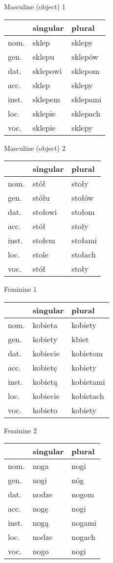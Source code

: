 \documentclass[10pt,twoside]{../filofax2}
\begin{document}
\begin{ffpage}{}
Masculine (object) 1
\begin{tabular}{|m{1cm}||m{2.5cm}|m{2.5cm}|}
	\hline
	&singular& plural\\ \hline
	nom. &sklep&sklepy \\ \hline
	gen. &sklepu&sklepów\\ \hline
	dat. &sklepowi&sklepom\\ \hline
	acc. &sklep&sklepy\\ \hline
	inst.&sklepem&sklepami\\ \hline
	loc. &sklepie&sklepach\\ \hline
	voc. &sklepie&sklepy\\ \hline
\end{tabular}

\vspace{0.75cm}
Masculine (object) 2
\begin{tabular}{|m{1cm}||m{2.5cm}|m{2.5cm}|}
	\hline
	&singular& plural\\ \hline
	nom. &stół&stoły\\ \hline
	gen. &stółu&stołów\\ \hline
	dat. &stołowi&stołom\\ \hline
	acc. &stół&stoły\\ \hline
	inst.&stołem&stołami\\ \hline
	loc. &stole&stołach\\ \hline
	voc. &stół&stoły\\\hline
\end{tabular}
\end{ffpage}

\begin{ffpage}{}
Feminine 1
\begin{tabular}{|m{1cm}||m{2.5cm}|m{2.5cm}|}
	\hline
	&singular& plural\\ \hline
	nom. &kobieta&kobiety\\ \hline
	gen. &kobiety&kbiet\\ \hline
	dat. &kobiecie&kobietom\\ \hline
	acc. &kobietę&kobiety\\\hline
	inst.&kobietą&kobietami\\ \hline
	loc. &kobiecie&kobietach\\ \hline
	voc. &kobieto&kobiety\\ \hline
\end{tabular}

\vspace{.75cm}
Feminine 2
\begin{tabular}{|m{1cm}||m{2.5cm}|m{2.5cm}|}
	\hline
	&singular& plural\\ \hline
	nom. &noga&nogi\\ \hline
	gen. &nogi&nóg\\ \hline
	dat. &nodze&nogom\\ \hline
	acc. &nogę&nogi\\ \hline
	inst.&nogą&nogami\\ \hline
	loc. &nodze&nogach\\ \hline
	voc. &nogo&nogi\\\hline
\end{tabular}
\end{ffpage}
\end{document}
